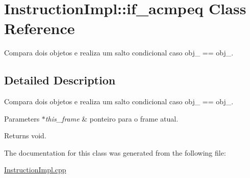 \hypertarget{class_instruction_impl_1_1if__acmpeq}{}\section{Instruction\+Impl\+:\+:if\+\_\+acmpeq Class Reference}
\label{class_instruction_impl_1_1if__acmpeq}


Compara dois objetos e realiza um salto condicional caso obj\+\_ == obj\+\_.  




\subsection{Detailed Description}
Compara dois objetos e realiza um salto condicional caso obj\+\_ == obj\+\_. 


\begin{DoxyParams}{Parameters}
{\em $\ast$this\+\_\+frame} & ponteiro para o frame atual. \\
\hline
\end{DoxyParams}
\begin{DoxyReturn}{Returns}
void. 
\end{DoxyReturn}


The documentation for this class was generated from the following file\+:\begin{DoxyCompactItemize}
\item 
\hyperlink{_instruction_impl_8cpp}{Instruction\+Impl.\+cpp}\end{DoxyCompactItemize}
